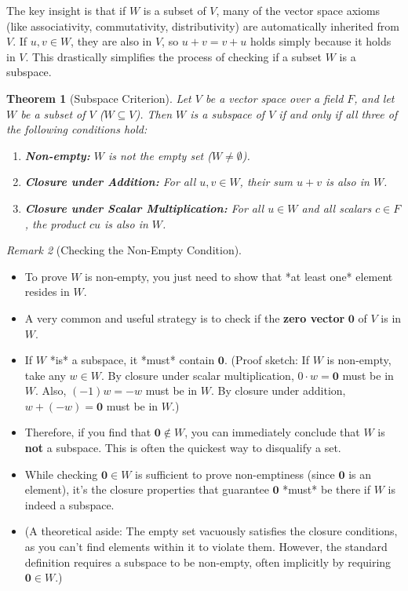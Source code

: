 \documentclass[11pt]{article}
\newtheorem{theorem}{Theorem}[section]
\theoremstyle{definition}
\theoremstyle{remark}
\newtheorem{remark}[theorem]{Remark}
\newcommand{\zerovec}{\mathbf{0}}
\begin{document}
The key insight is that if $W$ is a subset of $V$, many of the vector space axioms (like associativity, commutativity, distributivity) are automatically inherited from $V$. If $u, v \in W$, they are also in $V$, so $u+v=v+u$ holds simply because it holds in $V$. This drastically simplifies the process of checking if a subset $W$ is a subspace.

\begin{theorem}[Subspace Criterion] \label{thm:subspace_criterion}
Let $V$ be a vector space over a field $F$, and let $W$ be a subset of $V$ ($W \subseteq V$). Then $W$ is a subspace of $V$ if and only if all three of the following conditions hold:
\begin{enumerate}
    \item \textbf{Non-empty:} $W$ is not the empty set ($W \neq \emptyset$).
    \item \textbf{Closure under Addition:} For all $u, v \in W$, their sum $u+v$ is also in $W$.
    \item \textbf{Closure under Scalar Multiplication:} For all $u \in W$ and all scalars $c \in F$, the product $cu$ is also in $W$.
\end{enumerate}
\end{theorem}

\begin{remark}[Checking the Non-Empty Condition]
\begin{itemize}
    \item To prove $W$ is non-empty, you just need to show that *at least one* element resides in $W$.
    \item A very common and useful strategy is to check if the \textbf{zero vector} $\zerovec$ of $V$ is in $W$.
    \item If $W$ *is* a subspace, it *must* contain $\zerovec$. (Proof sketch: If $W$ is non-empty, take any $w \in W$. By closure under scalar multiplication, $0 \cdot w = \zerovec$ must be in $W$. Also, $(-1)w = -w$ must be in $W$. By closure under addition, $w + (-w) = \zerovec$ must be in $W$.)
    \item Therefore, if you find that $\zerovec \notin W$, you can immediately conclude that $W$ is \textbf{not} a subspace. This is often the quickest way to disqualify a set.
    \item While checking $\zerovec \in W$ is sufficient to prove non-emptiness (since $\zerovec$ is an element), it's the closure properties that guarantee $\zerovec$ *must* be there if $W$ is indeed a subspace.
    \item (A theoretical aside: The empty set vacuously satisfies the closure conditions, as you can't find elements within it to violate them. However, the standard definition requires a subspace to be non-empty, often implicitly by requiring $\zerovec \in W$.)
\end{itemize}
\end{remark}
\end{document}
